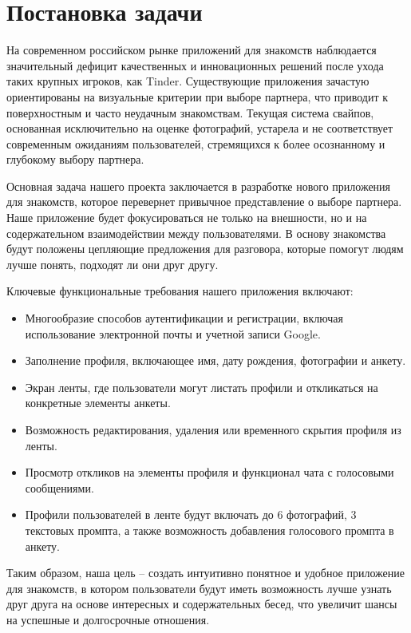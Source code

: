 \section{Постановка задачи}

На современном российском рынке приложений для знакомств наблюдается значительный дефицит качественных и инновационных решений после ухода таких крупных игроков, как Tinder. Существующие приложения зачастую ориентированы на визуальные критерии при выборе партнера, что приводит к поверхностным и часто неудачным знакомствам. Текущая система свайпов, основанная исключительно на оценке фотографий, устарела и не соответствует современным ожиданиям пользователей, стремящихся к более осознанному и глубокому выбору партнера.

Основная задача нашего проекта заключается в разработке нового приложения для знакомств, которое перевернет привычное представление о выборе партнера. Наше приложение будет фокусироваться не только на внешности, но и на содержательном взаимодействии между пользователями. В основу знакомства будут положены цепляющие предложения для разговора, которые помогут людям лучше понять, подходят ли они друг другу.

Ключевые функциональные требования нашего приложения включают:
\begin{itemize}
\item Многообразие способов аутентификации и регистрации, включая использование электронной почты и учетной записи Google.
\item Заполнение профиля, включающее имя, дату рождения, фотографии и анкету.
\item Экран ленты, где пользователи могут листать профили и откликаться на конкретные элементы анкеты.
\item Возможность редактирования, удаления или временного скрытия профиля из ленты.
\item Просмотр откликов на элементы профиля и функционал чата с голосовыми сообщениями.
\item Профили пользователей в ленте будут включать до 6 фотографий, 3 текстовых промпта, а также возможность добавления голосового промпта в анкету.
\end{itemize}

Таким образом, наша цель – создать интуитивно понятное и удобное приложение для знакомств, в котором пользователи будут иметь возможность лучше узнать друг друга на основе интересных и содержательных бесед, что увеличит шансы на успешные и долгосрочные отношения.